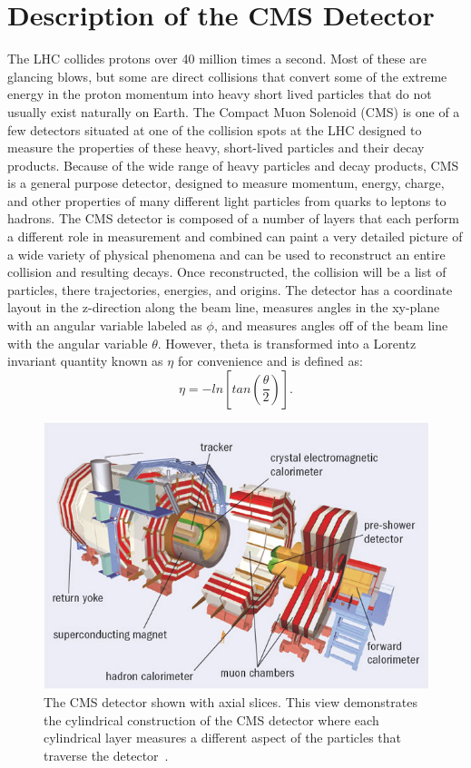 	\section{Description of the CMS Detector}        
		The LHC collides protons over 40 million times a second. Most of these are glancing blows, but some are direct collisions that convert some of the extreme energy in the proton momentum into heavy short lived particles that do not usually exist naturally on Earth. The Compact Muon Solenoid (CMS) is one of a few detectors situated at one of the collision spots at the LHC designed to measure the properties of these heavy, short-lived particles and their decay products. Because of the wide range of heavy particles and decay products, CMS is a general purpose detector, designed to measure momentum, energy, charge, and other properties of many different light particles from quarks to leptons to hadrons. The CMS detector is composed of a number of layers that each perform a different role in measurement and combined can paint a very detailed picture of a wide variety of physical phenomena and can be used to reconstruct an entire collision and resulting decays. Once reconstructed, the collision will be a list of particles, there trajectories, energies, and origins. The detector has a coordinate layout in the z-direction along the beam line, measures angles in the xy-plane with an angular variable labeled as $\phi$, and measures angles off of the beam line with the angular variable $\theta$. However, theta is transformed into a Lorentz invariant quantity known as $\eta$ for convenience and is defined as:
\begin{equation}
\eta = -ln \left[ tan \left( \frac{\theta}{2} \right) \right].
\end{equation}
		
\begin{figure}[h]
\begin{center}
\includegraphics[width=0.9\linewidth]{Figs/cms_detector_internal_clear.jpg}
\caption{\label{fig:cms_internal}
The CMS detector shown with axial slices. This view demonstrates the cylindrical construction of the CMS detector where each cylindrical layer measures a different aspect of the particles that traverse the detector~\cite{cmspic}.
}
\end{center}
\end{figure} 

